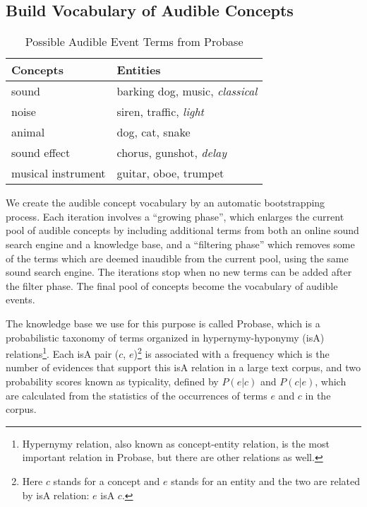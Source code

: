 \subsection{Build Vocabulary of Audible Concepts}
\label{sec:vocab}

\begin{table}
\centering
\caption{Possible Audible Event Terms from Probase}
\label{tab:audible}
\begin{tabular}{|l|l|} \hline
{\bf Concepts} & {\bf Entities} \\ \hline \hline
sound & barking dog, music, {\em classical}\\ \hline
noise & siren, traffic, {\em light} \\ \hline
animal & dog, cat, snake	\\ \hline
sound effect & chorus, gunshot, {\em delay}\\ \hline
musical instrument & 	guitar, oboe, trumpet \\ \hline
\end{tabular}
\end{table}

We create the audible concept vocabulary by an automatic bootstrapping process.
Each iteration involves a ``growing phase'', which enlarges the 
current pool of audible concepts by including
additional terms from both an online sound search engine and a knowledge base,
and a ``filtering phase'' which removes some of the 
terms which are deemed inaudible from the current pool, 
using the same sound search engine.
The iterations stop when no new terms can be added after the filter phase. 
The final pool of concepts become the vocabulary of audible events.

The knowledge base we use for this purpose is called
Probase\cite{wu2012probase}, which is a probabilistic taxonomy of terms
organized in hypernymy-hyponymy
(isA) relations\footnote{Hypernymy relation, also known as
concept-entity relation, is the most 
important relation in Probase, but there are other relations as well.}.
Each isA pair ($c$, $e$)\footnote{Here $c$ stands for a concept and
$e$ stands for an entity and the two are related by isA relation: $e$ isA $c$.} 
is associated with a frequency which is the
number of evidences that support this isA relation in a large text corpus, 
and two probability scores known as typicality, defined by
$P(e | c)$ and $P(c | e)$, which are calculated from the statistics of the
occurrences of terms $e$ and $c$ in the corpus.

